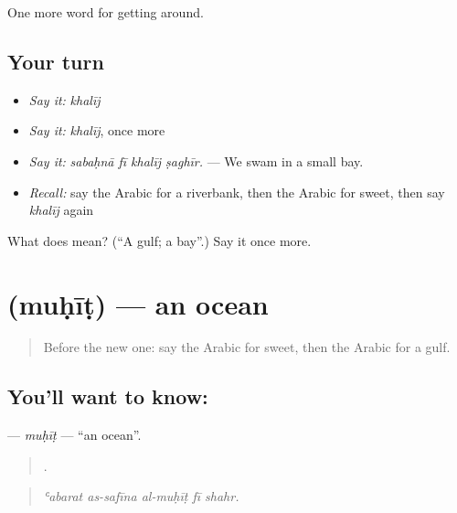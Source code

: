 \begin{grammarlens}[title={What you've built}]
One more word for getting around.
\end{grammarlens}

\subsection*{Your turn}
\begin{itemize}
\raggedright
  \item \emph{Say it:} \emph{khalīj}
  \item \emph{Say it:} \emph{khalīj}, once more
  \item \emph{Say it:} \emph{sabaḥnā fī khalīj ṣaghīr.} — We swam in a small bay.
  \item \emph{Recall:} say the Arabic for a riverbank, then the Arabic for sweet, then say \emph{khalīj} again
\end{itemize}

\begin{tcolorbox}[breakable,colback=teal!4,colframe=teal!35!black,title={Before you move on}]
What does  mean? (\textquotedblleft{}A gulf; a bay\textquotedblright{}.) Say it once more.
\end{tcolorbox}
\section[\texorpdfstring{\ar{محيط} (muḥīṭ)}{محيط (muḥīṭ)}]{ (muḥīṭ) — an ocean}

\label{lesson:AR-C471-muhit}



\begin{quote}
Before the new one: say the Arabic for sweet, then the Arabic for a gulf.
\end{quote}

\subsection*{You'll want to know: }
\textbf{} — \emph{muḥīṭ} — \textquotedblleft{}an ocean\textquotedblright{}.

\begin{quote}
    .
\end{quote}

\begin{quote}
\emph{ʿabarat as-safīna al-muḥīṭ fī shahr.}
\end{quote}

